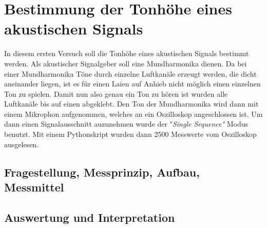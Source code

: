 %
%
\chapter{Bestimmung der Tonhöhe eines akustischen Signals}
\label{chap:VERSUCH_1}
In diesem ersten Versuch soll die Tonhöhe eines akustischen Signals bestimmt werden. Als akustischer Signalgeber soll eine Mundharmonika dienen. Da bei einer Mundharmonika Töne durch einzelne Luftkanäle erzeugt werden, die dicht aneinander liegen, ist es für einen Laien auf Anhieb nicht möglich einen einzelnen Ton zu spielen. Damit nun also genau ein Ton zu hören ist wurden alle Luftkanäle bis auf einen abgeklebt.
Den Ton der Mundharmonika wird dann mit einem Mikrophon aufgenommen, welches an ein Oszilloskop angeschlossen ist. Um dann einen Signalausschnitt auzunehmen wurde der "\textit{Single Sequence"} Modus benutzt. Mit einem Pythonskript wurden dann 2500 Messwerte vom Oszilloskop ausgelesen.
 
\section{Fragestellung, Messprinzip, Aufbau, Messmittel}
\label{chap:VERSUCH_1_FRAGESTELLUNG}


\section{Auswertung und Interpretation}
\label{chap:VERSUCH_1_AUSWERTUNG}

